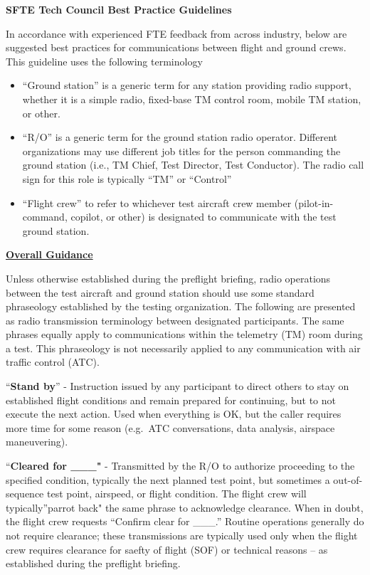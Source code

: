 \documentclass[
]{book}
\begin{document}
\textbf{SFTE Tech Council Best Practice Guidelines}

In accordance with experienced FTE feedback from across industry, below are
suggested best practices for communications between flight and ground crews.~
This guideline uses the following terminology

\begin{itemize}
\item
  ``Ground station'' is a generic term for any station providing radio support,
  whether it is a simple radio, fixed-base TM control room, mobile TM station, or other.
\item
  ``R/O'' is a generic term for the ground station radio operator. Different
  organizations may use different job titles for the person commanding the ground
  station (i.e., TM Chief, Test Director, Test Conductor). The radio call sign for
  this role is typically ``TM'' or ``Control''
\item
  ``Flight crew'' to refer to whichever test aircraft crew member
  (pilot-in-command, copilot, or other) is designated to communicate with the test
  ground station.
\end{itemize}

\textbf{\underline{Overall Guidance}}

Unless otherwise established during the preflight briefing, radio operations
between the test aircraft and ground station should use some standard
phraseology established by the testing organization. The following are presented
as radio transmission terminology between designated participants. The same
phrases equally apply to communications within the telemetry (TM) room during a
test. This phraseology is not necessarily applied to any communication with air
traffic control (ATC).

``\textbf{Stand by}'' - Instruction issued by any participant to direct others to stay
on established flight conditions and remain prepared for continuing, but to not
execute the next action. Used when everything is OK, but the caller requires
more time for some reason (e.g.~ATC conversations, data analysis, airspace
maneuvering).

``\textbf{Cleared for \_\_\_"} - Transmitted by the R/O to authorize proceeding to the
specified condition, typically the next planned test point, but sometimes a
out-of-sequence test point, airspeed, or flight condition. The flight crew will
typically''parrot back" the same phrase to acknowledge clearance. When in doubt,
the flight crew requests ``Confirm clear for \_\_\_.'' Routine operations
generally do not require clearance; these transmissions are typically used only
when the flight crew requires clearance for saefty of flight (SOF) or technical
reasons -- as established during the preflight briefing.
\end{document}
